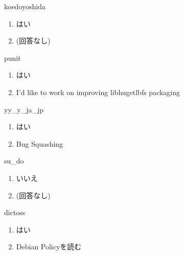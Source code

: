 \begin{prework}{ koedoyoshida }
  \begin{enumerate}
  \item はい
  \item (回答なし)
  \end{enumerate}
\end{prework}

\begin{prework}{ punit }
  \begin{enumerate}
  \item はい
  \item I'd like to work on improving libhugetlbfs packaging
  \end{enumerate}
\end{prework}

\begin{prework}{ yy\_y\_ja\_jp }
  \begin{enumerate}
  \item はい
  \item Bug Squashing
  \end{enumerate}
\end{prework}

\begin{prework}{ su\_do }
  \begin{enumerate}
  \item いいえ
  \item (回答なし)
  \end{enumerate}
\end{prework}

\begin{prework}{ dictoss }
  \begin{enumerate}
  \item はい
  \item Debian Policyを読む
  \end{enumerate}
\end{prework}
